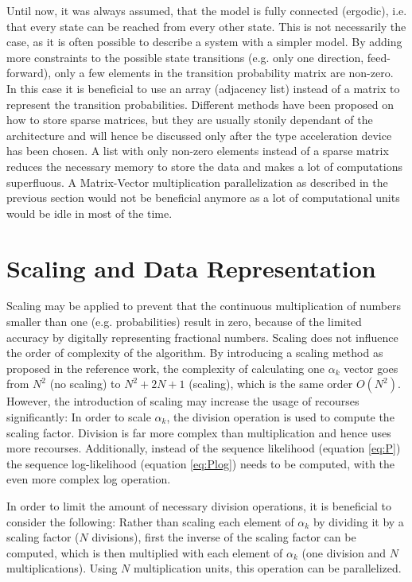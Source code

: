 \documentclass[mscthesis]{usiinfthesis}
\begin{document}
Until now, it was always assumed, that the model is fully connected (ergodic),
i.e. that every state can be reached from every other state. This is not
necessarily the case, as it is often possible to describe a system with
a simpler model. By adding more constraints to the possible state transitions
(e.g. only one direction, feed-forward), only a few elements in the transition
probability matrix are non-zero. In this case it is beneficial to use an array
(adjacency list) instead of a matrix to represent the transition probabilities.
Different methods have been proposed on how to store sparse matrices, but they
are usually stonily dependant of the architecture and will hence be discussed
only after the type acceleration device has been chosen.  A list with only
non-zero elements instead of a sparse matrix reduces the necessary memory to
store the data and makes a lot of computations superfluous.  A Matrix-Vector
multiplication parallelization as described in the previous section would not
be beneficial anymore as a lot of computational units would be idle in most of
the time.

\section{Scaling and Data Representation}
\label{ch:analysis_scaling}

Scaling may be applied to prevent that the continuous multiplication of numbers
smaller than one (e.g. probabilities) result in zero, because of the limited
accuracy by digitally representing fractional numbers. Scaling does not
influence the order of complexity of the algorithm. By introducing a scaling
method as proposed in the reference work, the complexity of calculating one
$\alpha_k$ vector goes from $N^2$ (no scaling) to $N^2 + 2N + 1$ (scaling),
which is the same order $O(N^2)$. However, the introduction of scaling may
increase the usage of recourses significantly: In order to scale $\alpha_k$,
the division operation is used to compute the scaling factor.  Division is far
more complex than multiplication and hence uses more recourses.  Additionally,
instead of the sequence likelihood (equation \ref{eq:P}) the sequence
log-likelihood (equation \ref{eq:Plog}) needs to be computed, with the even
more complex log operation.

In order to limit the amount of necessary division operations, it is beneficial
to consider the following: Rather than scaling each element of $\alpha_k$ by
dividing it by a scaling factor ($N$ divisions), first the inverse of the
scaling factor can be computed, which is then multiplied with each element of
$\alpha_k$ (one division and $N$ multiplications). Using $N$ multiplication
units, this operation can be parallelized.
\end{document}
